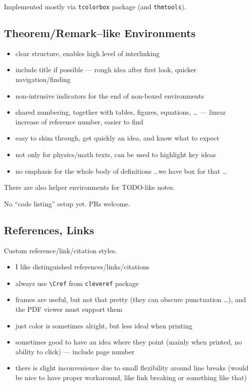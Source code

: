Implemented mostly via \texttt{tcolorbox} package (and \texttt{thmtools}).

\subsection{Theorem/Remark--like Environments}%
\label{sub:Theorem/Remark--like Environments}

\begin{itemize}
    \item clear structure, enables high level of interlinking
    \item include title if possible --- rough idea after first look, quicker navigation/finding
    \item non-intrusive indicators for the end of non-boxed environments
    \item shared numbering, together with tables, figures, equations, \ldots
          --- linear increase of reference number, easier to find
    \item easy to skim through, get quickly an idea, and know what to expect
    \item not only for physics/math texts, can be used to highlight key ideas
    \item no emphasis for the whole body of definitions \ldots we have box for that \ldots
\end{itemize}

\begin{Note}
    There are also helper environments for TODO-like notes.
\end{Note}

\begin{Note}
    No \enquote{code listing} setup yet.
    PRs welcome.
\end{Note}

\subsection{References, Links}%
\label{sub:References Links}

Custom reference/link/citation styles.
\begin{itemize}
    \item I like distinguished references/links/citations
    \item always use \verb|\Cref| from \texttt{cleveref} package
    \item frames are useful, but not that pretty (they can obscure punctuation \ldots),
          and the PDF viewer must support them
    \item just color is sometimes alright, but less ideal when printing
    \item sometimes good to have an idea where they point (mainly when printed, no ability to click) --- include page number
    \item there is slight inconvenience due to small flexibility around line breaks (would be nice to have proper workaround, like link breaking or something like that)
\end{itemize}

